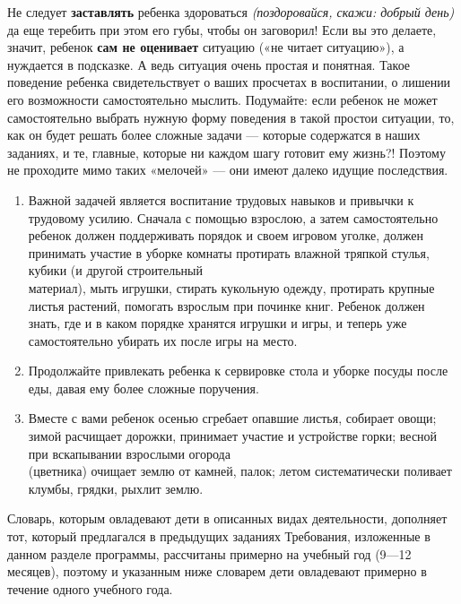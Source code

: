 \documentclass[a5paper]{book}
\renewcommand{\emph}[1]{\textit{#1}}
\begin{document}
Не следует \textbf{заставлять} ребенка здороваться \emph{(поздоровайся,
скажи: добрый день)} да еще теребить при этом его губы, чтобы он
заговорил! Если вы это делаете, значит, ребенок \textbf{сам не
оценивает} ситуацию («не читает ситуацию»), а нуждается в подсказке. А
ведь ситуация очень простая и понятная. Такое поведение ребенка
свидетельствует о ваших просчетах в воспитании, о лишении его
возможности самостоятельно мыслить. Подумайте: если ребенок не может
самостоятельно выбрать нужную форму поведения в такой простои ситуации,
то, как он будет решать более сложные задачи --- которые содержатся в
наших заданиях, и те, главные, которые ни каждом шагу готовит ему
жизнь?! Поэтому не проходите мимо таких «мелочей» --- они имеют далеко
идущие последствия.


\begin{enumerate}
\def\labelenumi{\arabic{enumi}.}
\setcounter{enumi}{5}
\item
  
  Важной задачей является воспитание трудовых навыков и привычки к
  трудовому усилию. Сначала с помощью взрослою, а затем самостоятельно
  ребенок должен поддерживать порядок и своем игровом уголке, должен
  принимать участие в уборке комнаты протирать влажной тряпкой стулья,
  кубики (и другой строительный\\
  материал), мыть игрушки, стирать кукольную одежду, протирать крупные
  листья растений, помогать взрослым при починке книг. Ребенок должен
  знать, где и в каком порядке хранятся игрушки и игры, и теперь уже
  самостоятельно убирать их после игры на место.
  
\item
  
  Продолжайте привлекать ребенка к сервировке стола и уборке посуды
  после еды, давая ему более сложные поручения.
  
\item
  
  Вместе с вами ребенок осенью сгребает опавшие листья, собирает овощи;
  зимой расчищает дорожки, принимает участие и устройстве горки; весной
  при вскапывании взрослыми огорода\\
  (цветника) очищает землю от камней, палок; летом систематически
  поливает клумбы, грядки, рыхлит землю.
  
\end{enumerate}


Словарь, которым овладевают дети в описанных видах деятельности,
дополняет тот, который предлагался в предыдущих заданиях Требования,
изложенные в данном разделе программы, рассчитаны примерно на учебный
год (9---12 месяцев), поэтому и указанным ниже словарем дети овладевают
примерно в течение одного учебного года.
\end{document}
